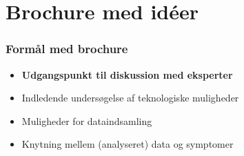 \section{Brochure med idéer}

\begin{frame}
\frametitle{Formål med brochure}

\begin{itemize}
\item \textbf{Udgangspunkt til diskussion med eksperter}
\item Indledende undersøgelse af teknologiske muligheder
\item Muligheder for dataindsamling
\item Knytning mellem (analyseret) data og symptomer
\end{itemize}

\end{frame}

